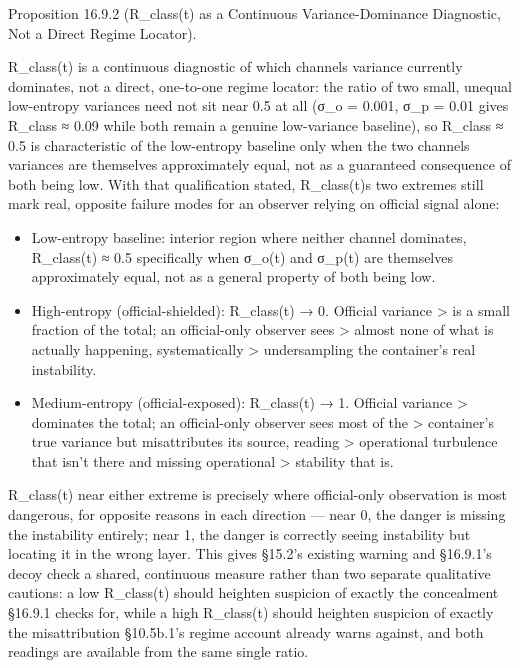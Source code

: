 \documentclass[
]{article}
\begin{document}
Proposition 16.9.2 (R\_class(t) as a Continuous Variance-Dominance
Diagnostic, Not a Direct Regime Locator).

R\_class(t) is a continuous diagnostic of which
channel\textquotesingle s variance currently dominates, not a direct,
one-to-one regime locator: the ratio of two small, unequal low-entropy
variances need not sit near 0.5 at all (σ\_o = 0.001, σ\_p = 0.01 gives
R\_class ≈ 0.09 while both remain a genuine low-variance baseline), so
R\_class ≈ 0.5 is characteristic of the low-entropy baseline only when
the two channels\textquotesingle{} variances are themselves
approximately equal, not as a guaranteed consequence of both being low.
With that qualification stated, R\_class(t)\textquotesingle s two
extremes still mark real, opposite failure modes for an observer relying
on official signal alone:

\begin{itemize}
\item
  Low-entropy baseline: interior region where neither channel dominates,
  R\_class(t) ≈ 0.5 specifically when σ\_o(t) and σ\_p(t) are themselves
  approximately equal, not as a general property of both being low.
\item
  High-entropy (official-shielded): R\_class(t) → 0. Official variance
  \textgreater{} is a small fraction of the total; an official-only
  observer sees \textgreater{} almost none of what is actually
  happening, systematically \textgreater{} undersampling the container's
  real instability.
\item
  Medium-entropy (official-exposed): R\_class(t) → 1. Official variance
  \textgreater{} dominates the total; an official-only observer sees
  most of the \textgreater{} container's true variance but misattributes
  its source, reading \textgreater{} operational turbulence that isn't
  there and missing operational \textgreater{} stability that is.
\end{itemize}

R\_class(t) near either extreme is precisely where official-only
observation is most dangerous, for opposite reasons in each direction
--- near 0, the danger is missing the instability entirely; near 1, the
danger is correctly seeing instability but locating it in the wrong
layer. This gives §15.2's existing warning and §16.9.1's decoy check a
shared, continuous measure rather than two separate qualitative
cautions: a low R\_class(t) should heighten suspicion of exactly the
concealment §16.9.1 checks for, while a high R\_class(t) should heighten
suspicion of exactly the misattribution §10.5b.1's regime account
already warns against, and both readings are available from the same
single ratio.
\end{document}
